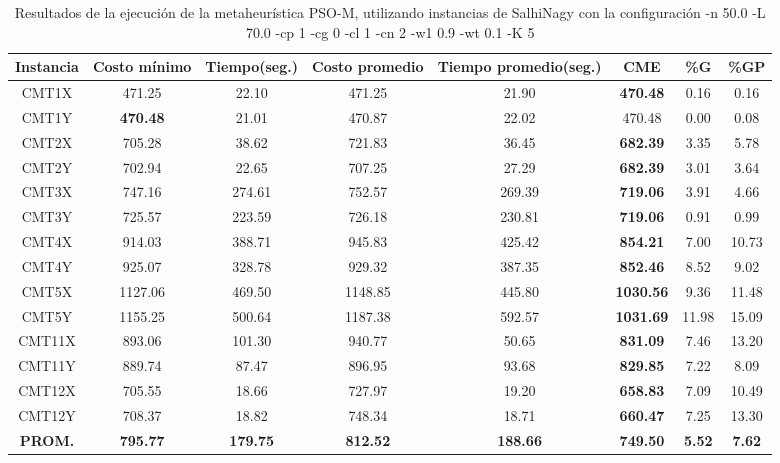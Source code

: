 \begin{table}[h]
\caption{Resultados de la ejecución de la metaheurística PSO-M, utilizando instancias de SalhiNagy con la configuración -n 50.0 -L 70.0 -cp 1 -cg 0 -cl 1 -cn 2 -w1 0.9 -wt 0.1 -K 5}
\centering
\small
\begin{tabular}{c c c c c c c c}
\hline\hline
Instancia & Costo mínimo & Tiempo(seg.) & Costo promedio & Tiempo promedio(seg.) & CME & \%G & \%GP \\ [0.5ex]
\hline
CMT1X & 471.25 & 22.10 & 
471.25 & 21.90 & \bf{470.48} & 
0.16 & 0.16\\CMT1Y & \bf{470.48} & 21.01 & 
470.87 & 22.02 & 470.48 & 0.00
 & 0.08\\CMT2X & 705.28 & 38.62 & 
721.83 & 36.45 & \bf{682.39} & 
3.35 & 5.78\\CMT2Y & 702.94 & 22.65 & 
707.25 & 27.29 & \bf{682.39} & 
3.01 & 3.64\\CMT3X & 747.16 & 274.61 & 
752.57 & 269.39 & \bf{719.06} & 
3.91 & 4.66\\CMT3Y & 725.57 & 223.59 & 
726.18 & 230.81 & \bf{719.06} & 
0.91 & 0.99\\CMT4X & 914.03 & 388.71 & 
945.83 & 425.42 & \bf{854.21} & 
7.00 & 10.73\\CMT4Y & 925.07 & 328.78 & 
929.32 & 387.35 & \bf{852.46} & 
8.52 & 9.02\\CMT5X & 1127.06 & 469.50 & 
1148.85 & 445.80 & \bf{1030.56} & 
9.36 & 11.48\\CMT5Y & 1155.25 & 500.64 & 
1187.38 & 592.57 & \bf{1031.69} & 
11.98 & 15.09\\CMT11X & 893.06 & 101.30 & 
940.77 & 50.65 & \bf{831.09} & 
7.46 & 13.20\\CMT11Y & 889.74 & 87.47 & 
896.95 & 93.68 & \bf{829.85} & 
7.22 & 8.09\\CMT12X & 705.55 & 18.66 & 
727.97 & 19.20 & \bf{658.83} & 
7.09 & 10.49\\CMT12Y & 708.37 & 18.82 & 
748.34 & 18.71 & \bf{660.47} & 
7.25 & 13.30\\\bf{PROM.} & 
\bf{795.77} & \bf{179.75} & \bf{812.52} & \bf{188.66} & \bf{749.50} & \bf{5.52} & \bf{7.62}\\[1ex]\hline
\end{tabular}
\label{table:nonlin}
\end{table}
